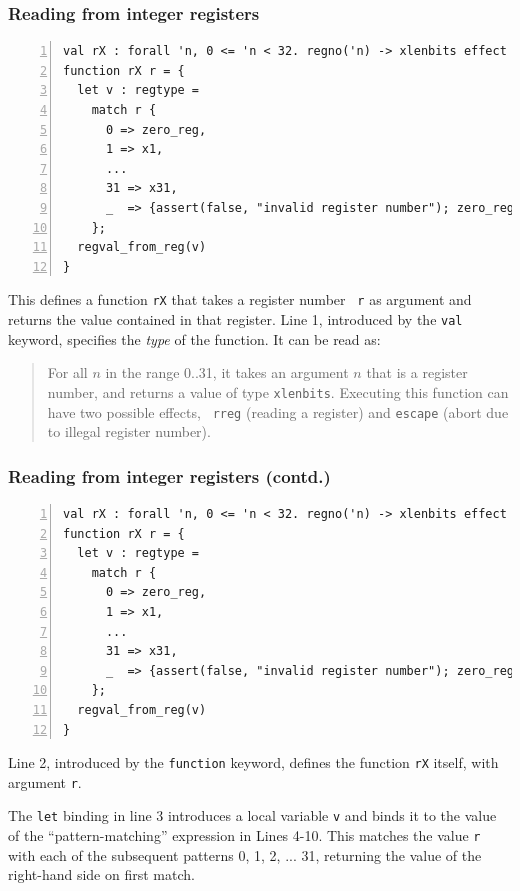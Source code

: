 \documentclass[aspectratio=169]{beamer}
\newcommand{\slidefont}{\scriptsize}
\newcommand{\cf}{\scriptsize\tt}
\begin{document}

\begin{frame}[fragile]
  \frametitle{Reading from integer registers}

  \slidefont

  \begin{Verbatim}[frame=single, numbers=left, label = File riscv\_regs.sail]
val rX : forall 'n, 0 <= 'n < 32. regno('n) -> xlenbits effect {rreg, escape}
function rX r = {
  let v : regtype =
    match r {
      0 => zero_reg,
      1 => x1,
      ...
      31 => x31,
      _  => {assert(false, "invalid register number"); zero_reg}
    };
  regval_from_reg(v)
}
  \end{Verbatim}

  \begin{minipage}{\textwidth}
    This defines a function {\cf rX} that takes a register number {\cf
      r} as argument and returns the value contained in that register.
    Line 1, introduced by the {\cf val} keyword, specifies the
    \emph{type} of the function.  It can be read as:

    \begin{quote}
      For all $n$ in the range 0..31, it takes an argument $n$ that is
      a register number, and returns a value of type {\cf xlenbits}.
      Executing this function can have two possible effects, {\cf
        rreg} (reading a register) and {\cf escape} (abort due to
      illegal register number).
    \end{quote}
  \end{minipage}

\end{frame}


\begin{frame}[fragile]
  \frametitle{Reading from integer registers (contd.)}

  \slidefont

  \begin{Verbatim}[frame=single, numbers=left, label = File riscv\_regs.sail]
val rX : forall 'n, 0 <= 'n < 32. regno('n) -> xlenbits effect {rreg, escape}
function rX r = {
  let v : regtype =
    match r {
      0 => zero_reg,
      1 => x1,
      ...
      31 => x31,
      _  => {assert(false, "invalid register number"); zero_reg}
    };
  regval_from_reg(v)
}
  \end{Verbatim}

  \begin{minipage}{\textwidth}
  Line 2, introduced by the {\cf function} keyword, defines the
  function {\cf rX} itself, with argument {\cf r}.

  \vspace{1ex}

  The {\cf let} binding in line 3 introduces a local variable {\cf v}
  and binds it to the value of the ``pattern-matching'' expression in
  Lines 4-10.  This matches the value {\cf r} with each of the
  subsequent patterns 0, 1, 2, ... 31, returning the value of the
  right-hand side on first match.

  \end{minipage}

\end{frame}
\end{document}
